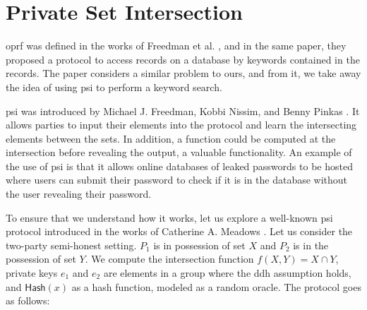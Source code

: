 \section{Private Set Intersection}
\label{sec:psi}

\acrshort{oprf} was defined in the works of Freedman et al. \cite{TCC:FIPR05}, and in the same paper, they proposed a protocol to access records on a database by keywords contained in the records. The paper considers a similar problem to ours, and from it, we take away the idea of using \acrshort{psi} to perform a keyword search. 

\acrshort{psi} was introduced by Michael J. Freedman, Kobbi Nissim, and Benny Pinkas \cite{EC:FreNisPin04}. It allows parties to input their elements into the protocol and learn the intersecting elements between the sets. In addition, a function could be computed at the intersection before revealing the output, a valuable functionality. An example of the use of \acrshort{psi} is that it allows online databases of leaked passwords to be hosted where users can submit their password to check if it is in the database without the user revealing their password.

\newcommand{\Hash}{\ensuremath{\mathsf{Hash}}}

To ensure that we understand how it works, let us explore a well-known \acrshort{psi} protocol introduced in the works of Catherine A. Meadows \cite{Meadows86}. Let us consider the two-party semi-honest setting. $ P_1 $ is in possession of set $ X $ and $ P_2 $ is in the possession of set $ Y $. We compute the intersection function $ f(X, Y) = X \cap Y $, private keys $ e_1 $ and $ e_2 $ are elements in a group where the \acrfull{ddh} assumption holds, and $ \Hash(x) $ as a hash function, modeled as a random oracle. The protocol goes as follows:


